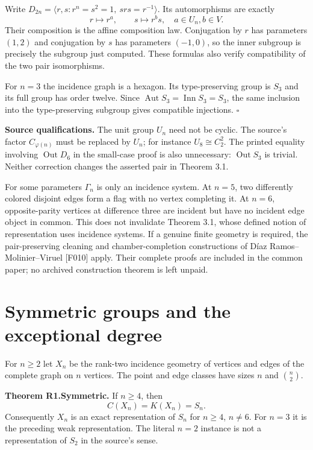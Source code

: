 Write \(D_{2n}=\langle r,s:r^n=s^2=1,\ srs=r^{-1}\rangle\). Its
automorphisms are exactly \[
r\mapsto r^a,\qquad s\mapsto r^b s,
\quad a\in U_n, b\in V.
\] Their composition is the affine composition law. Conjugation by \(r\)
has parameters \((1,2)\) and conjugation by \(s\) has parameters
\((-1,0)\), so the inner subgroup is precisely the subgroup just
computed. These formulas also verify compatibility of the two pair
isomorphisms.

For \(n=3\) the incidence graph is a hexagon. Its type-preserving group
is \(S_3\) and its full group has order twelve. Since
\(\operatorname{Aut}S_3=\operatorname{Inn}S_3=S_3\), the same inclusion
into the type-preserving subgroup gives compatible injections.
\(\square\)

\textbf{Source qualifications.} The unit group \(U_n\) need not be
cyclic. The source's factor \(C_{\varphi(n)}\) must be replaced by
\(U_n\); for instance \(U_8\cong C_2^2\). The printed equality involving
\(\operatorname{Out}D_6\) in the small-case proof is also unnecessary:
\(\operatorname{Out}S_3\) is trivial. Neither correction changes the
asserted pair in Theorem 3.1.

For some parameters \(\Gamma_n\) is only an incidence system. At
\(n=5\), two differently colored disjoint edges form a flag with no
vertex completing it. At \(n=6\), opposite-parity vertices at difference
three are incident but have no incident edge object in common. This does
not invalidate Theorem 3.1, whose defined notion of representation uses
incidence systems. If a genuine finite geometry is required, the
pair-preserving cleaning and chamber-completion constructions of Díaz
Ramos--Molinier--Viruel {[}F010{]} apply. Their complete proofs are included
in the common paper; no archived construction theorem is left unpaid.

\section{Symmetric groups and the exceptional
degree}\label{symmetric-groups-and-the-exceptional-degree}

For \(n\ge2\) let \(X_n\) be the rank-two incidence geometry of vertices
and edges of the complete graph on \(n\) vertices. The point and edge
classes have sizes \(n\) and \(\binom n2\).

\textbf{Theorem R1.Symmetric.} If \(n\ge4\), then \[
C(X_n)=K(X_n)=S_n.
\] Consequently \(X_n\) is an exact representation of \(S_n\) for
\(n\ge4\), \(n\ne6\). For \(n=3\) it is the preceding weak
representation. The literal \(n=2\) instance is not a representation of
\(S_2\) in the source's sense.

